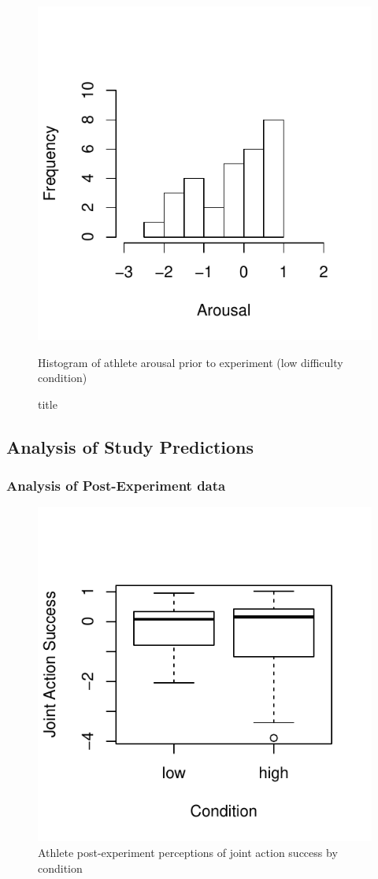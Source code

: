 \begin{figure}
  \centering
  \includegraphics[width=0.5\linewidth,keepaspectratio] {images/histArousalFactorPreLow-1}
      \caption{Histogram of athlete arousal prior to experiment (low difficulty condition)}
  \caption{title}
    \label{fig:histArousalFactorPreLow}
\end{figure}












\subsection{Analysis of Study Predictions\label{app6:analysisStudyPredictions}}





\subsubsection{Analysis of Post-Experiment data\label{app6:postExperimentData}}



\begin{figure}
    \centering
    \includegraphics[width=0.5\linewidth,keepaspectratio] {images/groupJointActionSuccessPostBoxPlot-1}
    \caption{Athlete post-experiment perceptions of joint action success by condition}
              \label{fig:groupJointActionSuccessPostBoxPlot}
\end{figure}

